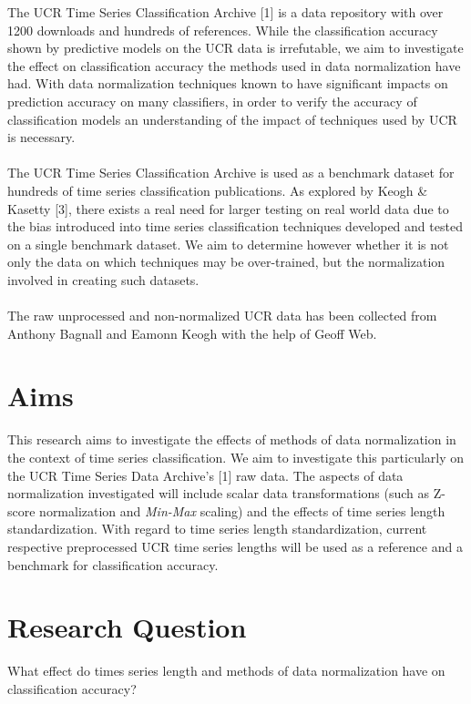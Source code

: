 \documentclass[10pt,a4paper]{article}
\begin{document}
The UCR Time Series Classification Archive [1] is a data repository with over 1200 downloads and hundreds of references. 
While the classification accuracy shown by predictive models on the UCR data is irrefutable, we aim to investigate the effect on classification accuracy the methods used in data normalization have had. 
With data normalization techniques known to have significant impacts on prediction accuracy on many classifiers, in order to verify the accuracy of classification models an understanding of the impact of techniques used by UCR is necessary.
\\\\
The UCR Time Series Classification Archive is used as a benchmark dataset for hundreds of time series classification publications.
As explored by Keogh \& Kasetty [3], there exists a real need for larger testing on real world data due to the bias introduced into time series classification techniques developed and tested on a single benchmark dataset.
We aim to determine however whether it is not only the data on which techniques may be over-trained, but the normalization involved in creating such datasets.
\\\\
The raw unprocessed and non-normalized UCR data has been collected from Anthony Bagnall and Eamonn Keogh with the help of Geoff Web.

\section{Aims}

This research aims to investigate the effects of methods of data normalization in the context of time series classification. 
We aim to investigate this particularly on the UCR Time Series Data Archive's [1] raw data.
The aspects of data normalization investigated will include scalar data transformations (such as Z-score normalization and \textit{Min-Max} scaling) and the effects of time series length standardization.
With regard to time series length standardization, current respective preprocessed UCR time series lengths will be used as a reference and a benchmark for classification accuracy.


\section{Research Question}

What effect do times series length and methods of data normalization have on classification accuracy?
\end{document}
